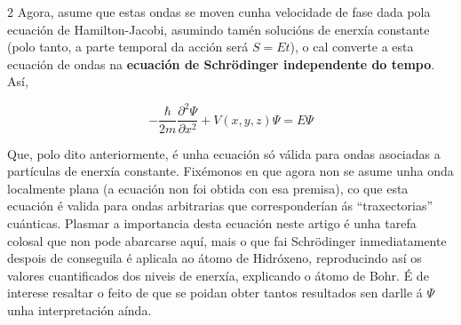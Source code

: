 \begin{multicols}{2}
Agora, asume que estas ondas se moven cunha velocidade de fase dada pola
ecuación de Hamilton-Jacobi, asumindo tamén solucións de
enerxía constante (polo tanto, a parte temporal da acción será $S=Et$), o cal
converte a esta ecuación de ondas na \textbf{ecuación de Schrödinger
independente do tempo}. Así,

\begin{equation}
    \boxed{
        -\frac{\hbar}{2m}\frac{\partial^2\Psi}{\partial x^2} +
        V(x,y,z)\Psi = E\Psi
    }
\end{equation}

Que, polo dito anteriormente, é unha ecuación só válida para ondas asociadas a
partículas de enerxía constante. Fixémonos en que agora non se asume unha onda localmente
plana (a ecuación non foi obtida con esa premisa), co que esta ecuación é
valida para ondas arbitrarias que corresponderían ás ``traxectorias''
cuánticas. Plasmar a importancia desta ecuación neste artigo é unha tarefa
colosal que non pode abarcarse aquí, mais o que fai Schrödinger inmediatamente
despois de conseguila é aplicala ao átomo de Hidróxeno, reproducindo así os
valores cuantificados dos niveis de enerxía, explicando o átomo de Bohr. É de
interese resaltar o feito de que se poidan obter tantos resultados sen darlle á
$\Psi$ unha interpretación aínda.


\nocite{schrodinger.e_1926}
\nocite{schrodinger.e_1926_2}
\nocite{hamilton_optico_mechanical}
\nocite{hamilton_jacobi_equation}

\printbibliography

\end{multicols}
